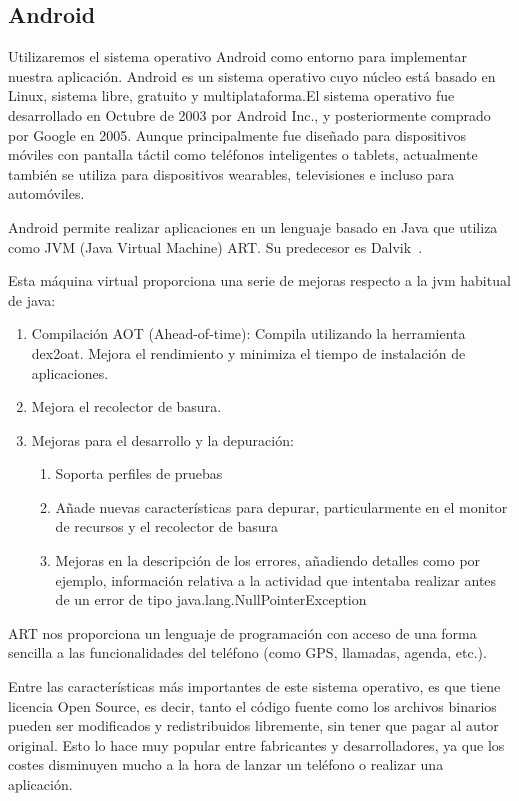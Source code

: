\subsection{Android}
Utilizaremos el sistema operativo Android como entorno para implementar 
nuestra aplicación.
Android es un sistema operativo cuyo núcleo está basado en Linux,
 sistema libre, gratuito y multiplataforma.El sistema operativo fue 
desarrollado en Octubre de 2003 por Android Inc., y posteriormente
 comprado por Google en 2005.
Aunque principalmente fue diseñado para dispositivos móviles con
 pantalla táctil como teléfonos inteligentes o tablets, actualmente
también se utiliza para dispositivos wearables, televisiones e incluso
 para automóviles.  

Android permite realizar aplicaciones en un lenguaje basado en Java 
que utiliza como JVM (Java Virtual Machine) ART. Su predecesor es Dalvik~\cite{ART}.


Esta máquina virtual proporciona una serie de mejoras respecto a la jvm habitual de java:
\begin{enumerate}
\item	Compilación AOT (Ahead-of-time): Compila utilizando la herramienta dex2oat.
 Mejora el rendimiento y minimiza el tiempo de instalación de aplicaciones.
\item	Mejora el recolector de basura.
\item	Mejoras para el desarrollo y la depuración:
\begin{enumerate}
\item	Soporta perfiles de pruebas
\item	Añade nuevas características para depurar, particularmente en el monitor
 de recursos y el recolector de basura
\item	Mejoras en la descripción de los errores, añadiendo detalles 
como por ejemplo, información relativa a la actividad que intentaba
 realizar antes de un error de tipo java.lang.NullPointerException
\end{enumerate}
\end{enumerate}

ART nos proporciona un lenguaje de programación con acceso 
de una forma sencilla a las funcionalidades del teléfono 
(como GPS, llamadas, agenda, etc.).

Entre las características más importantes de este sistema operativo,
 es que tiene licencia Open Source, es decir, tanto el código fuente 
como los archivos binarios pueden ser modificados y redistribuidos
 libremente, sin tener que pagar al autor original. Esto lo hace muy
 popular entre fabricantes y desarrolladores, ya que los costes 
disminuyen mucho a la hora de lanzar un teléfono o realizar una aplicación.
